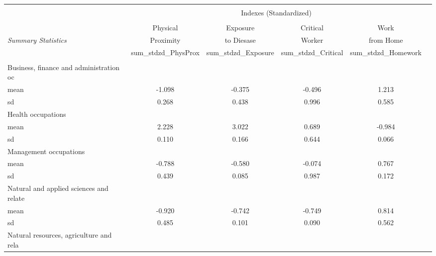 \begin{tabular*}{\hsize}{ @{\extracolsep{\fill}}l*{5}{c}}
\hline\hline
\\
 &\multicolumn{4}{c}{Indexes (Standardized)} \\
\cline{2-5} \\
&\multicolumn{1}{c}{Physical} &\multicolumn{1}{c}{Exposure} &\multicolumn{1}{c}{Critical} &\multicolumn{1}{c}{Work} \\
\textit{Summary Statistics} &\multicolumn{1}{c}{Proximity} &\multicolumn{1}{c}{to Diesase} &\multicolumn{1}{c}{Worker} &\multicolumn{1}{c}{from Home} \\
                                                  &sum\_stdzd\_PhysProx&sum\_stdzd\_Exposure&sum\_stdzd\_Critical&sum\_stdzd\_Homework\\
\hline
\\
\hspace{0.25cm}Business, finance and administration oc           &    &    &    &    \\
mean                                              &-1.098&-0.375&-0.496&1.213\\
sd                                                &0.268&0.438&0.996&0.585\\
\hspace{0.25cm}Health occupations                                &    &    &    &    \\
mean                                              &2.228&3.022&0.689&-0.984\\
sd                                                &0.110&0.166&0.644&0.066\\
\hspace{0.25cm}Management occupations                            &    &    &    &    \\
mean                                              &-0.788&-0.580&-0.074&0.767\\
sd                                                &0.439&0.085&0.987&0.172\\
\hspace{0.25cm}Natural and applied sciences and relate           &    &    &    &    \\
mean                                              &-0.920&-0.742&-0.749&0.814\\
sd                                                &0.485&0.101&0.090&0.562\\
\hspace{0.25cm}Natural resources, agriculture and rela           &    &    &    &    \\

\end{tabular*}
